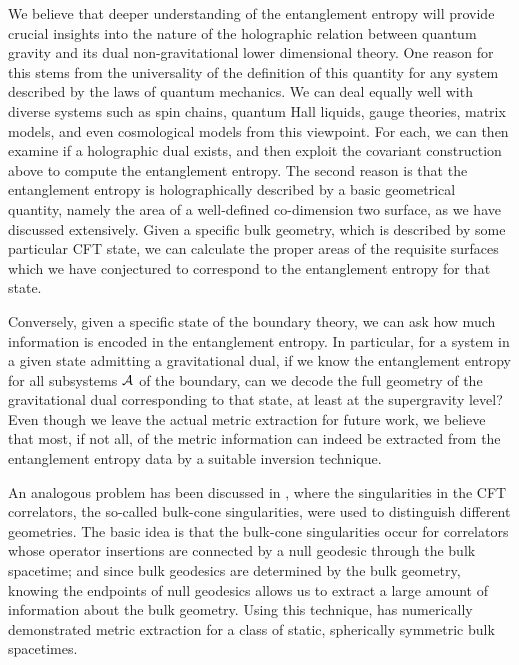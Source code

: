 \documentclass[12pt]{article}
\def\CA{{\cal A}}
\def\rA{\CA}
\begin{document}
We believe that deeper understanding of the entanglement entropy
will provide crucial insights into the nature of the holographic relation
between quantum gravity and its dual
non-gravitational lower dimensional theory. One reason for this stems
from the universality of the definition of this quantity for any system
 described by the laws of quantum mechanics. We
can deal equally well with diverse systems such as spin chains,
 quantum Hall liquids, gauge theories, matrix models, and even
cosmological models from this viewpoint. For each, we can then examine if
a holographic dual exists, and then exploit the covariant construction above to compute the entanglement entropy. The second reason is that the
entanglement entropy is holographically described by a basic
geometrical quantity, namely the area of a
well-defined co-dimension two surface, as we have discussed extensively.
 Given a specific bulk geometry, which is described by some particular CFT state, we can calculate the proper areas of the requisite surfaces which we have conjectured to correspond to the entanglement entropy for that state.

Conversely, given a specific state of the boundary theory, we can ask how much information is encoded in the entanglement entropy.  In particular, for a system  in a given state admitting a gravitational dual, if we know the entanglement entropy for all subsystems $\rA$ of the boundary, can we decode the full geometry of the gravitational dual corresponding to that state, at least at the supergravity level?  Even though we leave the actual metric extraction for future work, we believe that most, if not all, of the metric information can indeed be extracted from the entanglement entropy data by a suitable inversion technique.

An analogous problem has been discussed in \cite{Hubeny:2006yu}, where the singularities in the CFT correlators, the so-called bulk-cone singularities, were used to distinguish different geometries.  The basic idea is that the bulk-cone singularities occur for correlators whose operator insertions are connected by a null geodesic through the bulk spacetime; and since bulk geodesics are determined by the bulk geometry, knowing the endpoints of null geodesics allows us to extract a large amount of information about the bulk geometry.  Using this technique, \cite{Hammersley:2006cp} has numerically demonstrated metric extraction for a class of static, spherically symmetric bulk spacetimes.
\end{document}
